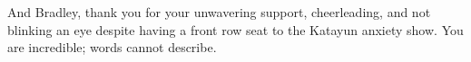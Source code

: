 And Bradley, thank you for your unwavering support, cheerleading, and not blinking an eye despite having a front row seat to the Katayun anxiety show. You are incredible; words cannot describe.   %
 
\endgroup
